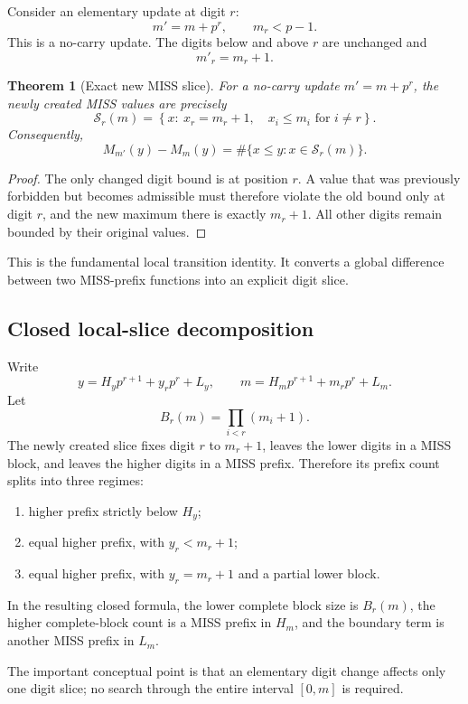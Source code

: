 \documentclass[11pt,a4paper]{article}
\newtheorem{theorem}{Theorem}[section]
\theoremstyle{definition}
\theoremstyle{remark}
\begin{document}
Consider an elementary update at digit $r$:
\[
 m'=m+p^r,
 \qquad m_r<p-1.
\]
This is a no-carry update.  The digits below and above $r$ are unchanged and
\[
 m'_r=m_r+1.
\]

\begin{theorem}[Exact new MISS slice]
For a no-carry update $m'=m+p^r$, the newly created MISS values are precisely
\[
 \mathcal S_r(m)=
 \left\{
 x:\ x_r=m_r+1,
 \quad x_i\le m_i\text{ for }i\ne r
 \right\}.
\]
Consequently,
\[
 M_{m'}(y)-M_m(y)
 =\#\{x\le y:x\in\mathcal S_r(m)\}.
\]
\end{theorem}
\begin{proof}
The only changed digit bound is at position $r$.  A value that was previously forbidden but becomes admissible must therefore violate the old bound only at digit $r$, and the new maximum there is exactly $m_r+1$.  All other digits remain bounded by their original values.
\end{proof}

This is the fundamental local transition identity.  It converts a global difference between two MISS-prefix functions into an explicit digit slice.

\subsection{Closed local-slice decomposition}

Write
\[
 y
 =H_y p^{r+1}+y_rp^r+L_y,
\qquad
 m
 =H_m p^{r+1}+m_rp^r+L_m.
\]
Let
\[
 B_r(m)=\prod_{i<r}(m_i+1).
\]
The newly created slice fixes digit $r$ to $m_r+1$, leaves the lower digits in a MISS block, and leaves the higher digits in a MISS prefix.  Therefore its prefix count splits into three regimes:
\begin{enumerate}[label=(\alph*)]
    \item higher prefix strictly below $H_y$;
    \item equal higher prefix, with $y_r<m_r+1$;
    \item equal higher prefix, with $y_r=m_r+1$ and a partial lower block.
\end{enumerate}
In the resulting closed formula, the lower complete block size is $B_r(m)$, the higher complete-block count is a MISS prefix in $H_m$, and the boundary term is another MISS prefix in $L_m$.

The important conceptual point is that an elementary digit change affects only one digit slice; no search through the entire interval $[0,m]$ is required.
\end{document}
